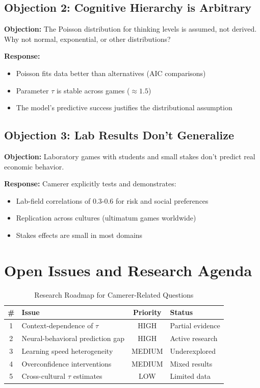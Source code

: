 \subsection{Objection 2: Cognitive Hierarchy is Arbitrary}

\textbf{Objection:} The Poisson distribution for thinking levels is assumed, not derived. Why not normal, exponential, or other distributions?

\textbf{Response:}
\begin{itemize}[nosep]
\item Poisson fits data better than alternatives (AIC comparisons)
\item Parameter $\tau$ is stable across games ($\approx 1.5$)
\item The model's predictive success justifies the distributional assumption
\end{itemize}

\subsection{Objection 3: Lab Results Don't Generalize}

\textbf{Objection:} Laboratory games with students and small stakes don't predict real economic behavior.

\textbf{Response:} Camerer explicitly tests and demonstrates:
\begin{itemize}[nosep]
\item Lab-field correlations of 0.3-0.6 for risk and social preferences
\item Replication across cultures (ultimatum games worldwide)
\item Stakes effects are small in most domains
\end{itemize}


\section{Open Issues and Research Agenda}
\label{sec:ca-open}

\begin{table}[htbp]
\centering
\caption{Research Roadmap for Camerer-Related Questions}
\label{tab:ca-roadmap}
\renewcommand{\arraystretch}{1.3}
\begin{tabular}{@{}clcl@{}}
\toprule
\textbf{\#} & \textbf{Issue} & \textbf{Priority} & \textbf{Status} \\
\midrule
1 & Context-dependence of $\tau$ & HIGH & Partial evidence \\
2 & Neural-behavioral prediction gap & HIGH & Active research \\
3 & Learning speed heterogeneity & MEDIUM & Underexplored \\
4 & Overconfidence interventions & MEDIUM & Mixed results \\
5 & Cross-cultural $\tau$ estimates & LOW & Limited data \\
\bottomrule
\end{tabular}
\end{table}


